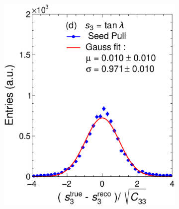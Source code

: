 \begin{figure}[t]
\begin{subfigure}{0.32\textwidth}
         \caption{}
         \label{fig:resp2SeedGAr_IntI}
     \end{subfigure}
          \begin{subfigure}{0.32\textwidth}
         \centering
         \includegraphics[width=\textwidth]{figures/ch5-KF_NDGAr/FullSample/Int/Units/IdealUnit3Seed.eps}
         \caption{}
         \label{fig:resp3SeedGAr_IntI}
     \end{subfigure}
     \begin{subfigure}{0.32\textwidth}
         \centering

\end{subfigure}
\end{figure}
